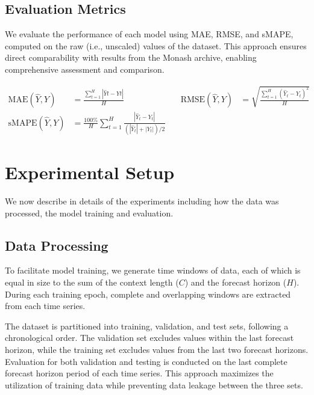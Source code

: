 \documentclass{article}
\newcommand{\horizon}{H}
\newcommand{\contextlength}{C}
\newcommand{\timeserieslength}{T}
\newcommand{\datasettscount}{K}
\newcommand{\ts}{t}
\begin{document}
\subsection{Evaluation Metrics}
We evaluate the performance of each model using MAE, RMSE, and sMAPE, computed on the raw (i.e., unscaled) 
values of the dataset. This approach ensures direct comparability with results from 
the Monash archive\cite{DBLP:conf/nips/GodahewaBWHM21}, enabling comprehensive assessment and comparison.

\begin{equation*}
\begin{aligned}
\text{MAE}(\hat{Y}, Y) &= \frac{ \sum_{\ts=1}^{\horizon}|\hat{Y}\ts - Y\ts|}{\horizon} &
\quad
\text{RMSE}(\hat{Y}, Y) &= \sqrt{\frac{\sum_{\ts=1}^{\horizon}(\hat{Y}_\ts - Y_\ts)^2}{\horizon}} \\
\text{sMAPE}(\hat{Y}, Y) &= \frac{100\%}{\horizon}\sum_{\ts=1}^{\horizon}\frac{|\hat{Y}_\ts - Y_\ts|}{(|\hat{Y}_\ts| + |Y_\ts|)/2}
\end{aligned}
\end{equation*}

\section{Experimental Setup}
We now describe in details of the experiments including how the data was processed, the 
model training and evaluation.

\subsection{Data Processing}
To facilitate model training, we generate time windows of data, each of which is equal in 
size to the sum of the context length ($\contextlength$) and the forecast horizon ($\horizon$). During each training epoch, 
complete and overlapping windows are extracted from each time series. 




The dataset is partitioned into training, validation, and test sets, following a chronological order. 
The validation set excludes values within the last forecast horizon, while the training set excludes 
values from the last two forecast horizons. Evaluation for both validation and testing is conducted 
on the last complete forecast horizon period of each time series. This approach maximizes the 
utilization of training data while preventing data leakage between the three sets.
\end{document}
